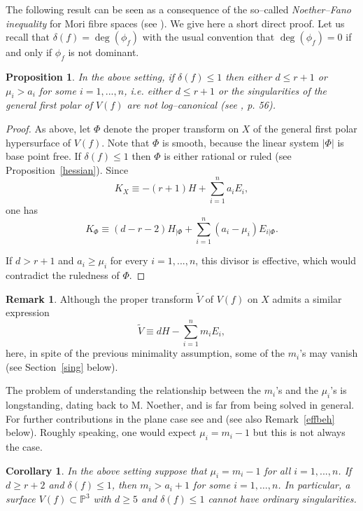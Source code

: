 \documentclass[11pt]{article}   %
\newtheorem{Proposition}[Theorem]{Proposition}
\newtheorem{Corollary}[Theorem]{Corollary}
\theoremstyle{definition}
\newtheorem{Remark}[Theorem]{Remark}
\numberwithin{Theorem}{section} \numberwithin{equation}{section}
\newcommand{\p}{{\mathbb P}}
\begin{document}
{\medskip

The following result can be seen as a
consequence of the so--called \emph{Noether--Fano
inequality} for Mori fibre spaces (see \cite {Corti}). We give here
a short direct proof. Let us recall that $\delta(f)=\deg(\phi_f)$
with the usual convention that $\deg(\phi_f)=0$ if and only if
$\phi_f$ is not dominant.


\begin{Proposition}\label {codimen} In the above setting, if
$\delta(f)\leq 1$ then either $d\leq r+1$ or $\mu_i>a_i$ for some
$i=1,...,n$, i.e. either $d\leq r+1$ or  the singularities of the
general first polar of $V(f)$ are not \emph {log--canonical}
{\rm (see \cite {KM}, p. 56)}.
\end{Proposition}

\begin{proof} As above, let $\Phi$ denote the proper transform
on $X$ of the general first polar hypersurface of $V(f)$. Note that
$\Phi$ is smooth, because the linear system $|\Phi|$ is base point
free. If $\delta(f)\leq 1$  then $\Phi$ is either rational or ruled
(see Proposition~\ref{hessian}). Since
$$K_X\equiv -(r+1)H+\sum_{i=1}^ n a_iE_i,$$
one has
$$K_\Phi\equiv (d-r-2)H_{\big| \Phi}+\sum_{i=1}^ n (a_i-\mu_i)E_{i\big| \Phi}.$$

If $d>r+1$ and $a_i\geq \mu_i$ for every $i=1,...,n$, this divisor
is effective, which would contradict the ruledness of $\Phi$.
\end{proof}
\medskip

\begin{Remark}\label{eeff} Although the proper transform $\tilde{V}$ of $V(f)$ on
$X$ admits a similar expression
$$\tilde{V}\equiv dH-\sum_{i=1}^ n m_iE_i,$$
here, in spite of the previous minimality assumption, some of the
$m_i$'s may vanish (see Section~\ref{sing} below).
\end{Remark}

 The problem of understanding the relationship between the
$m_i$'s and the $\mu_i$'s is longstanding, dating back to M.
Noether, and is far from being solved in general. For further
contributions in the plane case see \cite{segp} and \cite{ves} (see
also Remark~\ref{effbeh} below). Roughly speaking, one would expect
$\mu_i=m_i-1$ but this is not always the case.

\begin{Corollary} In the above setting suppose that
 $\mu_i=m_i-1$ for all $i=1,...,n$. If $d\geq r+2$ and $\delta(f)\leq 1$, then $m_i>a_i+1$ for some $i=1,\ldots, n$.
In particular, a surface $V(f)\subset \p^ 3$ with $d\geq 5$ and
$\delta(f)\leq 1$ cannot have {\it ordinary\/} singularities.
\end{Corollary}







}
\end{document}
